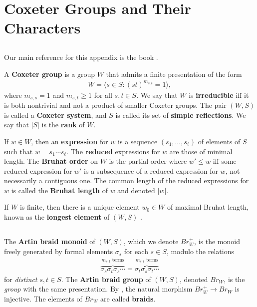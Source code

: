 \documentclass[a4paper,10pt,leqno]{amsart}
\theoremstyle{plain}
\theoremstyle{plain}
\theoremstyle{plain}
\theoremstyle{definition}
\theoremstyle{remark}
\newcommand{\dfemph}[1]{\textbf{#1}}
\newcommand{\Br}{\mathit{Br}}
\begin{document}
\newpage

\appendix

\section{Coxeter Groups and Their Characters}\label{sec:coxeter}

\subsection{}\label{subsec:coxeter-group}

Our main reference for this appendix is the book \cite{gp}.

A \dfemph{Coxeter group} is a group $W$ that admits a finite presentation of the form
\begin{align}
W = \langle s \in S : (st)^{m_{s, t}} = 1\rangle,
\end{align}
where $m_{s,s} = 1$ and $m_{s, t}  \geq 1$ for all $s, t \in S$.
We say that $W$ is \dfemph{irreducible} iff it is both nontrivial and not a product of smaller Coxeter groups.
The pair $(W, S)$ is called a \dfemph{Coxeter system}, and $S$ is called its set of \dfemph{simple reflections}.
We say that $|S|$ is the \dfemph{rank} of $W$.

If $w \in W$, then an \dfemph{expression} for $w$ is a sequence $(s_1, \ldots, s_\ell)$ of elements of $S$ such that $w = s_1 \cdots s_\ell$.
The \dfemph{reduced} expressions for $w$ are those of minimal length.
The \dfemph{Bruhat order} on $W$ is the partial order where $w' \leq w$ iff some reduced expression for $w'$ is a subsequence of a reduced expression for $w$, not necessarily a contiguous one.
The common length of the reduced expressions for $w$ is called the \dfemph{Bruhat length} of $w$ and denoted $|w|$.

If $W$ is finite, then there is a unique element $w_0 \in W$ of maximal Bruhat length, known as the \dfemph{longest element} of $(W, S)$ \cite[\S{1.5}]{gp}.

\subsection{}\label{subsec:braid-group}

The \dfemph{Artin braid monoid} of $(W, S)$, which we denote $\Br_W^+$, is the monoid freely generated by formal elements $\sigma_s$ for each $s \in S$, modulo the relations 
\begin{align}
\overbrace{\sigma_s \sigma_t \sigma_s \cdots}^{\text{$m_{s, t}$ terms}}
=
\overbrace{\sigma_t \sigma_s \sigma_t \cdots}^{\text{$m_{s, t}$ terms}}
\end{align}
for \emph{distinct} $s, t \in S$.
The \dfemph{Artin braid group} of $(W, S)$, denoted $\Br_W$, is the \emph{group} with the same presentation.
By \cite[Prop.\ 4.1.10]{gp}, the natural morphism $\Br_W^+ \to \Br_W$ is injective.
The elements of $\Br_W$ are called \dfemph{braids}.
\end{document}
